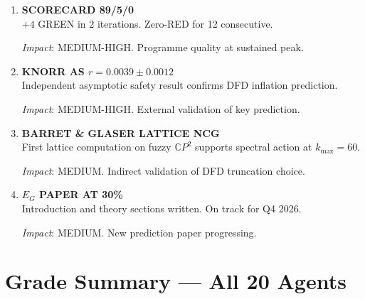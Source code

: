 \documentclass[11pt,a4paper]{article}
\newcommand{\CP}{\mathbb{C}P}
\begin{document}
\begin{enumerate}[label=\textbf{\arabic*.}, leftmargin=1.5cm]
\item \textbf{SCORECARD 89/5/0}\\
$+4$ GREEN in 2 iterations. Zero-RED for 12 consecutive.

\textit{Impact}: MEDIUM-HIGH. Programme quality at sustained peak.

\item \textbf{KNORR AS $r = 0.0039 \pm 0.0012$}\\
Independent asymptotic safety result confirms DFD inflation prediction.

\textit{Impact}: MEDIUM-HIGH. External validation of key prediction.

\item \textbf{BARRET \& GLASER LATTICE NCG}\\
First lattice computation on fuzzy $\CP^2$ supports spectral action at $k_{\max} = 60$.

\textit{Impact}: MEDIUM. Indirect validation of DFD truncation choice.

\item \textbf{$E_G$ PAPER AT 30\%}\\
Introduction and theory sections written. On track for Q4 2026.

\textit{Impact}: MEDIUM. New prediction paper progressing.

\end{enumerate}


\section{Grade Summary --- All 20 Agents}
\label{sec:grades}
\end{document}
